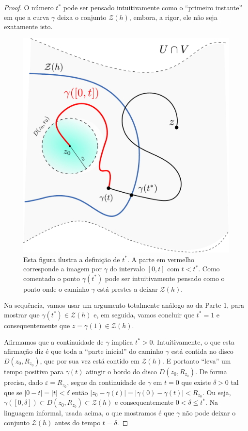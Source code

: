 \begin{proof}
O número $t^{*}$ pode ser pensado intuitivamente como 
o ``primeiro instante'' em que a curva $\gamma$ deixa 
o conjunto $\mathcal{Z}(h)$, embora, a rigor,
ele não seja exatamente isto.

\begin{figure}[h]
\centering
\includegraphics[width=0.55\linewidth]{Figuras/zeros-isolados5}
\caption{Esta figura ilustra a definição de $t^{*}$. A parte em vermelho corresponde a imagem por $\gamma$ do intervalo $[0,t]$ com $t<t^{*}$. Como comentado o ponto $\gamma(t^{*})$ pode ser intuitivamente pensado como o ponto onde o caminho $\gamma$ está prestes a deixar $\mathcal{Z}(h)$.}
\label{fig:zeros-isolados5}
\end{figure}





\medskip 

Na sequência, vamos usar um argumento totalmente análogo ao da Parte 1, 
para mostrar que $\gamma(t^{*})\in \mathcal{Z}(h)$ e, em
seguida, vamos concluir que $t^{*}=1$ e consequentemente que 
$z=\gamma(1)\in \mathcal{Z}(h)$.

\medskip 

Afirmamos que a continuidade de $\gamma$ implica $t^{*}>0$. 
Intuitivamente, o que esta afirmação diz é que toda a ``parte inicial'' 
do caminho $\gamma$ está contida no disco $D(z_0,R_{z_0})$, que por sua vez
está contido em $\mathcal{Z}(h)$. E portanto ``leva'' um tempo positivo para $\gamma(t)$ atingir o bordo do disco $D(z_0,R_{z_0})$. 
De forma precisa, dado $\varepsilon= R_{z_0}$,
segue da continuidade de $\gamma$ em $t=0$ que 
existe $\delta>0$ tal que se $|0-t|=|t|<\delta$ então 
$|z_0-\gamma(t)|=|\gamma(0)-\gamma(t)|<R_{z_0}$. Ou seja, 
$\gamma([0,\delta])\subset D(z_0,R_{z_0})\subset\mathcal{Z}(h)$ e 
consequentemente $0<\delta\leq t^{*}$. Na linguagem informal, usada
acima, o que mostramos é que $\gamma$ não pode deixar o conjunto $\mathcal{Z}(h)$
antes do tempo $t=\delta$. 






\end{proof}
